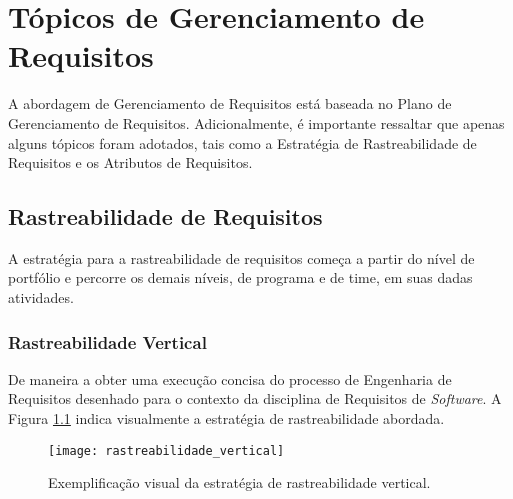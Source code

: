 \chapter[Tópicos de Gerenciamento de Requisitos]{Tópicos de Gerenciamento de Requisitos}
\label{chap:tgr}
	A abordagem de Gerenciamento de Requisitos está baseada no Plano de Gerenciamento de Requisitos. Adicionalmente, é importante ressaltar que apenas alguns tópicos foram adotados, tais como a Estratégia de Rastreabilidade de Requisitos e os Atributos de Requisitos.

	\section[Rastreabilidade de Requisitos]{Rastreabilidade de Requisitos}
	\label{sec:tgr_rastreabilidade}
		A estratégia para a rastreabilidade de requisitos começa a partir do nível de portfólio e  percorre os demais níveis, de programa e de time, em suas dadas atividades.

		\subsection[Rastreabilidade Vertical]{Rastreabilidade Vertical}
		\label{subsec:tgr_rastreabilidade_vertical}
			De maneira a obter uma execução concisa do processo de Engenharia de Requisitos desenhado para o contexto da disciplina de Requisitos de \emph{Software}. A Figura \ref{fig:rastreabilidade_vertical} indica visualmente a estratégia de rastreabilidade abordada.

			\begin{figure}[h]
				\centering
				\texttt{[image: rastreabilidade\_vertical]}
				\caption[Exemplo de Estratégia de Rastreabilidade Vertical]{Exemplificação visual da estratégia de rastreabilidade vertical.}
				\label{fig:rastreabilidade_vertical}
			\end{figure}
			\ \newline
